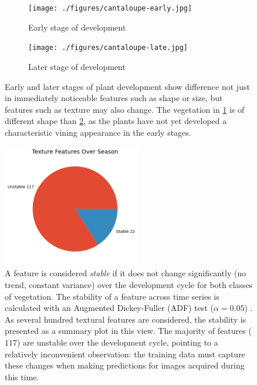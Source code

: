 \documentclass[letterpaper]{report}
\begin{document}
\begin{figure}[H]
	\centering
	\begin{subfigure}[h]{0.45\linewidth}
		\centering
		\texttt{[image: ./figures/cantaloupe-early.jpg]}
		\caption{Early stage of development}
		\label{subfig:cantaloupe-early}	
	\end{subfigure}
	\begin{subfigure}[h]{0.45\linewidth}
		\centering
		\texttt{[image: ./figures/cantaloupe-late.jpg]}
		\caption{Later stage of development}
		\label{subfig:cantaloupe-late}		
	\end{subfigure}%
	\caption[Early and later stages of vining plant development]{Early and later stages of plant development show difference not just in immediately noticeable features such as shape or size, but features such as texture may also change. The vegetation in \ref{subfig:cantaloupe-early} is of different shape  than \ref{subfig:cantaloupe-late}, as the plants have not yet developed a characteristic vining appearance in the early stages.}
	\label{fig:cantaloupe}
\end{figure}
%


\begin{figure}[h!]
	\centering
	\includegraphics[width=6cm]{./figures/season-texture.png}
	\caption[Stability of factor over growing season]{A feature is considered \textit{stable} if it does not change significantly (no trend, constant variance) over the development cycle for both classes of vegetation. The stability of a feature across time series is calculated with an Augmented Dickey-Fuller (ADF) test ($\alpha=0.05$) \parencite{Dickey1979-ft}. As several hundred textural features are considered, the stability is presented as a summary plot in this view. The majority of features ($117$) are unstable over the development cycle, pointing to a relatively inconvenient observation: the training data must capture these changes when making predictions for images acquired during this time.}
	\label{fig:season-texture}
\end{figure}
\end{document}
